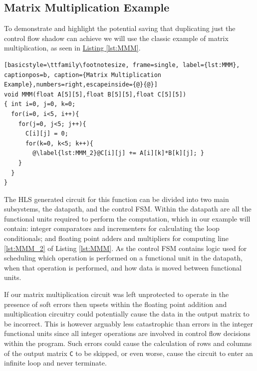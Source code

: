 \providecommand*{\lstnumberautorefname}{line}
\subsection{Matrix Multiplication Example}
To demonstrate and highlight the potential saving that duplicating just
the control flow shadow can achieve we will use the classic example of
matrix multiplication, as seen in \hyperref[lst:MMM]{Listing \ref{lst:MMM}}.

\lstset{language=C}
\begin{lstlisting}[basicstyle=\ttfamily\footnotesize, frame=single, label={lst:MMM}, captionpos=b, caption={Matrix Multiplication Example},numbers=right,escapeinside={@}{@}]
void MMM(float A[5][5],float B[5][5],float C[5][5])
{ int i=0, j=0, k=0;
  for(i=0, i<5, i++){
    for(j=0, j<5; j++){
      C[i][j] = 0;
      for(k=0, k<5; k++){
        @\label{lst:MMM_2}@C[i][j] += A[i][k]*B[k][j]; }
    }
  }
}
\end{lstlisting}

The HLS generated circuit for this function can be divided into two main subsystems, the datapath, and the control FSM.
Within the datapath are all the functional units required to perform the computation, which in our example will contain:
integer comparators and incrementers for calculating the loop conditionals; and floating point adders and multipliers
for computing line \autoref{lst:MMM_2} of Listing \ref{lst:MMM}.
As the control FSM contains logic used for scheduling which operation is performed on a functional unit in the datapath,
when that operation is performed, and how data is moved between functional units.

If our matrix multiplication circuit was left unprotected to operate in the presence of soft errors then upsets within
the floating point addition and multiplication circuitry could potentially cause the data in the output
matrix to be incorrect.
This is however arguably less catastrophic than errors in the integer functional units since all integer operations
are involved in control flow decisions within the program.
Such errors could cause the calculation of rows and columns of the output matrix \lstinline$C$ to be skipped, or even
worse, cause the circuit to enter an infinite loop and never terminate.

